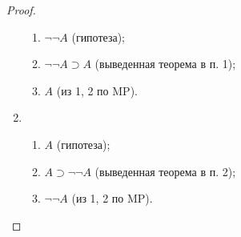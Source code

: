 \begin{proof}
\begin{enumerate}[label=\arabic*)]
\begin{enumerate}[label=\arabic*.]
            \item $\neg\neg A$ (гипотеза);
            \item $\neg\neg A \supset A$ (выведенная теорема в п. 1);
            \item $A$ (из 1, 2 по MP).
        \end{enumerate}
        \item
        \begin{enumerate}[label=\arabic*.]
            \item $A$ (гипотеза);
            \item $A \supset \neg\neg A$ (выведенная теорема в п. 2);
            \item $\neg\neg A$ (из 1, 2 по MP).
        \end{enumerate}
    \end{enumerate}
\end{proof}

